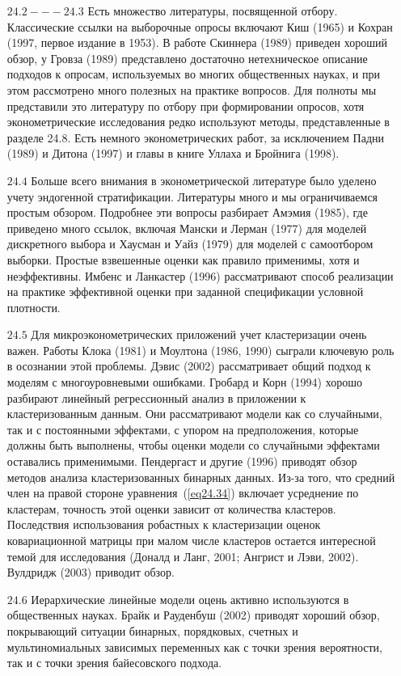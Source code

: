 \begin{enumerate}
\item[$24.2 --- 24.3$] Есть множество литературы, посвященной отбору. Классические ссылки на выборочные опросы включают Киш (1965) и Кохран (1997, первое издание в 1953). В работе Скиннера (1989) приведен хороший обзор, у Гровза (1989) представлено достаточно нетехническое описание подходов к опросам, используемых во многих общественных науках, и при этом рассмотрено много полезных на практике вопросов. Для полноты мы представили это литературу по отбору при формировании опросов, хотя эконометрические исследования редко используют методы, представленные в разделе 24.8. Есть немного эконометрических работ, за исключением Падни (1989) и Дитона (1997) и главы в книге Уллаха и Бройнига (1998). 
\item[$24.4$] Больше всего внимания в эконометрической литературе было уделено учету эндогенной стратификации. Литературы много и мы ограничиваемся простым обзором. Подробнее эти вопросы разбирает Амэмия (1985), где приведено много ссылок, включая Мански и Лерман (1977) для моделей дискретного выбора и Хаусман и Уайз (1979) для моделей с самоотбором выборки. Простые взвешенные оценки как правило применимы, хотя и неэффективны. Имбенс и Ланкастер (1996) рассматривают способ реализации на практике эффективной оценки при заданной спецификации условной плотности. 
\item[$24.5$] Для микроэконометрических приложений учет кластеризации очень важен. Работы Клока (1981) и Моултона (1986, 1990) сыграли ключевую роль в осознании этой проблемы. Дэвис (2002) рассматривает общий подход к моделям с многоуровневыми ошибками. Гробард и Корн (1994) хорошо разбирают линейный регрессионный анализ в приложении к кластеризованным данным. Они рассматривают модели как со случайными, так и с постоянными эффектами, с упором на предположения, которые должны быть выполнены, чтобы оценки модели со случайными эффектами оставались применимыми. Пендергаст и другие (1996) приводят обзор методов анализа кластеризованных бинарных данных. Из-за того, что средний член на правой стороне уравнения~(\ref{eq24.34}) включает усреднение по кластерам, точность этой оценки зависит от количества кластеров. Последствия использования робастных к кластеризации оценок ковариационной матрицы при малом числе кластеров остается интересной темой для исследования (Доналд и Ланг, 2001; Ангрист и Лэви, 2002). Вулдридж (2003) приводит обзор. 
\item[$24.6$] Иерархические линейные модели оцень активно используются в общественных науках. Брайк и Рауденбуш (2002) приводят хороший обзор, покрывающий ситуации бинарных, порядковых, счетных и мультиномиальных зависимых переменных как с точки зрения вероятности, так и с точки зрения байесовского подхода. 

\end{enumerate}
